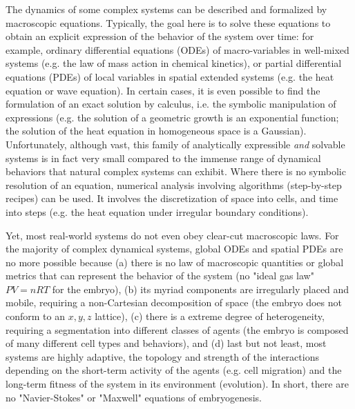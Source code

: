   The dynamics of some complex systems can be described and formalized by macroscopic equations. Typically, the goal here is to solve these equations to obtain an explicit expression of the behavior of the system over time: for example, ordinary differential equations (ODEs) of macro-variables in well-mixed systems (e.g. the law of mass action in chemical kinetics), or partial differential equations (PDEs) of local variables in spatial extended systems (e.g. the heat equation or wave equation). In certain cases, it is even possible to find the formulation of an exact solution by calculus, i.e. the symbolic manipulation of expressions (e.g. the solution of a geometric growth is an exponential function; the solution of the heat equation in homogeneous space is a Gaussian). Unfortunately, although vast, this family of analytically expressible \textit{and} solvable systems is in fact very small compared to the immense range of dynamical behaviors that natural complex systems can exhibit. Where there is no symbolic resolution of an equation, numerical analysis involving algorithms (step-by-step recipes) can be used. It involves the discretization of space into cells, and time into steps (e.g. the heat equation under irregular boundary conditions).  

  Yet, most real-world systems do not even obey clear-cut macroscopic laws. For the majority of complex dynamical systems, global ODEs and spatial PDEs are no more possible because (a) there is no law of macroscopic quantities or global metrics that can represent the behavior of the system (no "ideal gas law" $PV = nRT$ for the embryo), (b) its myriad components are irregularly placed and mobile, requiring a non-Cartesian decomposition of space (the embryo does not conform to an $x,y,z$ lattice), (c) there is a extreme degree of heterogeneity, requiring a segmentation into different classes of agents (the embryo is composed of many different cell types and behaviors), and (d) last but not least, most systems are highly adaptive, the topology and strength of the interactions depending on the short-term activity of the agents (e.g. cell migration) and the long-term fitness of the system in its environment (evolution). In short, there are no "Navier-Stokes" or "Maxwell" equations of embryogenesis. 

